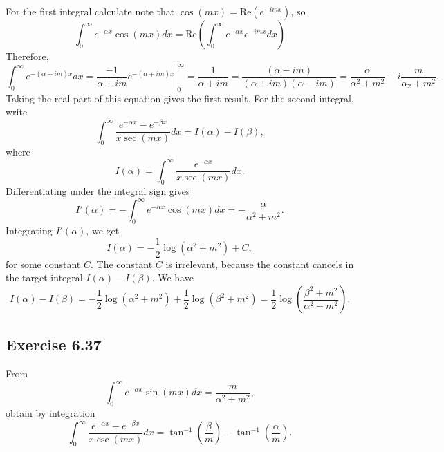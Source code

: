 For the first integral calculate note that $\cos(mx) = \mathrm{Re}(e^{-imx})$, so
\begin{equation*}
    \int_0^{\infty} e^{-\alpha x} \cos(mx) dx
        = \mathrm{Re} \left( \int_0^{\infty} e^{-\alpha x} e^{-imx} dx \right)
\end{equation*}
Therefore,
\begin{equation*}
    \int_0^{\infty} e^{-(\alpha + im)x} dx
        = \left. \frac{-1}{\alpha + im} e^{-(\alpha + im)x} \right|_0^{\infty}
        = \frac{1}{\alpha + im}
        = \frac{(\alpha - im)}{(\alpha + im)(\alpha - im)}
        = \frac{\alpha}{\alpha^2 + m^2} - i \frac{m}{\alpha_2 + m^2}.
\end{equation*}
Taking the real part of this equation gives the first result.
For the second integral, write
\begin{equation*}
    \int_0^{\infty} \frac{e^{-\alpha x} - e^{-\beta x}}{x \sec(mx)} dx = I(\alpha) - I(\beta),
\end{equation*}
where
\begin{equation*}
    I(\alpha) = \int_0^{\infty} \frac{e^{-\alpha x}}{x \sec(mx)} dx.
\end{equation*}
Differentiating under the integral sign gives
\begin{equation*}
    I'(\alpha) = -\int_0^{\infty} e^{-\alpha x} \cos(mx) dx = -\frac{\alpha}{\alpha^2 + m^2}.
\end{equation*}
Integrating $I'(\alpha)$, we get
\begin{equation*}
    I(\alpha) = -\frac{1}{2} \log(\alpha^2 + m^2) + C,
\end{equation*}
for some constant $C$.
The constant $C$ is irrelevant, because the constant cancels in the target integral $I(\alpha) - I(\beta)$.
We have
\begin{equation*}
    I(\alpha) - I(\beta) = -\frac{1}{2} \log(\alpha^2 + m^2) + \frac{1}{2} \log(\beta^2 + m^2)
        = \frac{1}{2} \log \left( \frac{\beta^2 + m^2}{\alpha^2 + m^2} \right).
\end{equation*}


\subsection*{Exercise 6.37}

From
\begin{equation*}
    \int_0^{\infty} e^{-\alpha x} \sin(mx) dx = \frac{m}{\alpha^2 + m^2},
\end{equation*}
obtain by integration
\begin{equation*}
    \int_0^{\infty} \frac{e^{-\alpha x} - e^{-\beta x}}{x \csc(mx)} dx = \tan^{-1}\left(\frac{\beta}{m}\right) - \tan^{-1}\left(\frac{\alpha}{m}\right).
\end{equation*}

